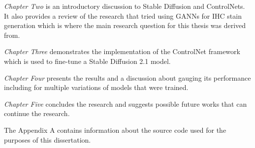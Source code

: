 \emph{Chapter Two} is an introductory discussion to Stable Diffusion and ControlNets. It also provides a review of the research that tried using GANNs for IHC stain generation which is where the main research question for this thesis was derived from. 

\emph{Chapter Three} demonstrates the implementation of the ControlNet framework which is used to fine-tune a Stable Diffusion 2.1 model.

\emph{Chapter Four} presents the results and a discussion about gauging its performance including for multiple variations of models that were trained.

\emph{Chapter Five} concludes the research and suggests possible future works that can continue the research.

\vspace{5 mm}

The Appendix A contains information about the source code used for the purposes of this dissertation. 

\vspace{5 mm}




